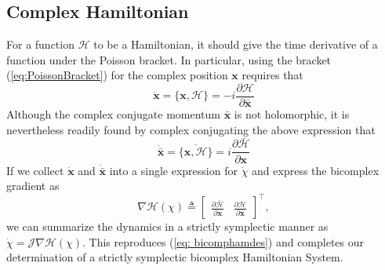 
 


\subsection{Complex Hamiltonian}
\label{sec: ham}

For a function $\mathcal{H}$ to be a Hamiltonian, it should give the time derivative of a function under the Poisson bracket.  
In particular, using the bracket (\ref{eq:PoissonBracket}) for the complex position $\textbf{x}$ requires that 
\begin{equation}
\label{eq:Poissonx}
    \dot{\textbf{x}}=\{\textbf{x},\mathcal{H}\}= -i\frac{\partial\mathcal{H}}{\partial \bar{\textbf{x}}}
\end{equation}
Although the complex conjugate momentum $\bar{\textbf{x}}$ is not holomorphic, it is nevertheless readily found by complex conjugating the above expression that
\begin{equation}
\label{eq:Poissonxbar}
    \dot{\bar{\textbf{x}}}=\overline{\{\textbf{x},\mathcal{H}\}}=i\frac{\partial \bar{\mathcal{H}}}{\partial \textbf{x}}
\end{equation}
If we collect $\dot{\textbf{x}}$ and $\dot{\bar{\textbf{x}}}$ into a single expression for $\dot{\chi}$ and
express the bicomplex gradient as 
\begin{equation}
\label{eq:BicomplexGradient}
    \nabla \mathcal{H}(\chi) \triangleq \begin{bmatrix}
    \frac{\partial {\bar{\mathcal{H}}}}{\partial \textbf{x}} &\frac{\partial {\mathcal{H}}}{\partial \bar{{\textbf{x}}}}
    \end{bmatrix}^\intercal,
\end{equation}
we can summarize the dynamics in a strictly symplectic manner as $\Dot{\chi}=\mathcal{J}\nabla\mathcal{H}(\chi)$.
 This reproduces (\ref{eq: bicomphamdes}) and completes our determination of a strictly symplectic bicomplex Hamiltonian System.
 
